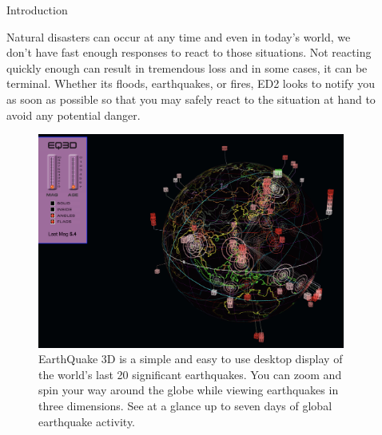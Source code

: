 \documentclass[final]{beamer}
\newlength{\sepwid}
\newlength{\onecolwid}
\newlength{\twocolwid}
\begin{document}
\begin{frame}[t]
\begin{columns}[t]
\begin{column}{\onecolwid}
\begin{block}{Introduction}

Natural disasters can occur at any time and even in today’s world, we don’t have fast enough responses to react to those situations. Not reacting quickly enough can result in tremendous loss and in some cases, it can be terminal. Whether its  floods, earthquakes, or fires, ED2 looks to notify you as soon as possible so that you may safely react to the situation at hand to avoid any potential danger. 

\end{block}


\begin{figure}
\includegraphics[width=0.8\linewidth]{Earthquakes.png}
\caption{EarthQuake 3D is a simple and easy to use desktop display of the world's last 20 significant earthquakes. You can zoom and spin your way around the globe while viewing earthquakes in three dimensions. See at a glance up to seven days of global earthquake activity.}
\end{figure}


\end{column} %

\begin{column}{\sepwid}\end{column} %

\begin{column}{\twocolwid} %

\begin{columns}[t,totalwidth=\twocolwid] %


\end{columns}
\end{column}
\end{columns}
\end{frame}
\end{document}
